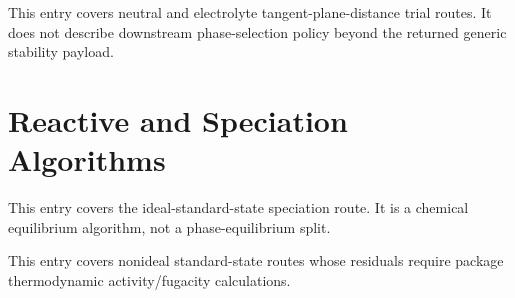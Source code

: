 \documentclass[12pt, letterpaper]{article}
\begin{document}
This entry covers neutral and electrolyte tangent-plane-distance trial routes.
It does not describe downstream phase-selection policy beyond the returned
generic stability payload.

\section{Reactive and Speciation Algorithms}


This entry covers the ideal-standard-state speciation route. It is a chemical
equilibrium algorithm, not a phase-equilibrium split.


This entry covers nonideal standard-state routes whose residuals require
package thermodynamic activity/fugacity calculations.

\end{document}
